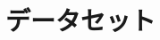 \documentclass[11pt]{jreport}
\begin{document}



\chapter{データセット}\label{sec:dataset}
\end{document}
